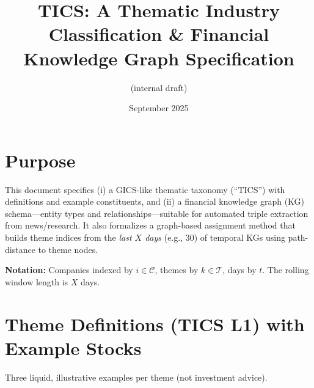 \documentclass[11pt]{article}
\title{TICS: A Thematic Industry Classification \& Financial Knowledge Graph Specification}
\author{(internal draft)}
\date{September 2025}
\begin{document}
\maketitle

\section*{Purpose}
This document specifies (i) a GICS-like thematic taxonomy (``TICS'') with definitions and example constituents, and (ii) a financial knowledge graph (KG) schema---entity types and relationships---suitable for automated triple extraction from news/research. It also formalizes a graph-based assignment method that builds theme indices from the \emph{last $X$ days} (e.g., 30) of temporal KGs using path-distance to theme nodes.

\vspace{0.5em}
\noindent\textbf{Notation:} Companies indexed by $i\in\mathcal{C}$, themes by $k\in\mathcal{T}$, days by $t$. The rolling window length is $X$ days.

\section{Theme Definitions (TICS L1) with Example Stocks}
Three liquid, illustrative examples per theme (not investment advice).
\end{document}
